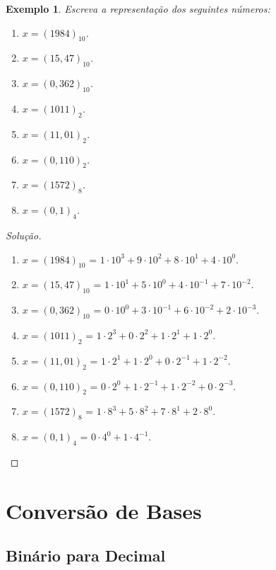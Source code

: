 \documentclass[
	12pt,				%
	openright,			%
	twoside,			%
	a4paper,			%
	english,			%
	french,				%
	brazil,				%
	sumario=tradicional
]{abntex2}
\newtheorem{example}{Exemplo}
\newenvironment{solution}{
	\begin{proof}[Solução]
}{\end{proof}}
\numberwithin{example}{chapter}
\numberwithin{remark}{chapter}
\numberwithin{definition}{chapter}
\numberwithin{figure}{chapter}
\begin{document}
\begin{example}
	Escreva a representação dos seguintes números:
	\begin{enumerate}
	    \item $x=(1984)_{10}$.
	    \item $x=(15,47)_{10}$.
    	\item $x=(0,362)_{10}$.
    	\item $x=(1011)_{2}$.
    	\item $x=(11,01)_{2}$.
    	\item $x=(0,110)_{2}$.
    	\item $x=(1572)_{8}$.
    	\item $x=(0,1)_{4}$.
	\end{enumerate}
\end{example}
\begin{solution}\hfill
	\begin{enumerate}
	    \item $x=(1984)_{10}$ = $1\cdot 10^3 + 9\cdot 10^2 + 8\cdot 10^1 + 4\cdot 10^0$.
	    \item $x=(15,47)_{10}$ = $1\cdot 10^1 + 5\cdot 10^0 + 4\cdot 10^{-1} + 7\cdot 10^{-2}$.
    	\item $x=(0,362)_{10}$ = $0\cdot 10^0 + 3\cdot 10^{-1} + 6\cdot 10^{-2} + 2\cdot 10^{-3}$.
    	\item $x=(1011)_{2}$ = $1\cdot 2^3 + 0\cdot 2^2 + 1 \cdot 2^1 + 1 \cdot 2^0$.
    	\item $x=(11,01)_{2}$ = $1\cdot 2^1 + 1\cdot 2^0 + 0\cdot 2^{-1} + 1\cdot 2^{-2}$.
    	\item $x=(0,110)_{2}$ = $0\cdot 2^0 + 1\cdot 2^{-1} + 1\cdot 2^{-2} + 0\cdot 2^{-3}$.
    	\item $x=(1572)_{8}$ = $1\cdot 8^3 + 5\cdot 8^2 + 7\cdot 8^1 + 2\cdot 8^0$.
    	\item $x=(0,1)_{4}$ = $0\cdot 4^0 + 1 \cdot 4^{-1}$.
	\end{enumerate}
\end{solution}

\section{Conversão de Bases}

\subsection{Binário para Decimal}
\end{document}
